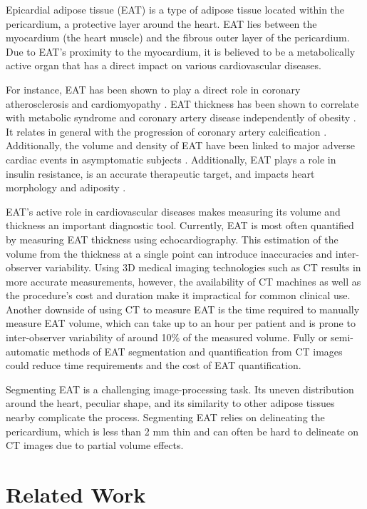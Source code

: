 Epicardial adipose tissue (EAT) is a type of adipose tissue located within the pericardium, a protective layer around the heart. EAT lies between the myocardium (the heart muscle) and the fibrous outer layer of the pericardium. Due to EAT's proximity to the myocardium, it is believed to be a metabolically active organ that has a direct impact on various cardiovascular diseases.

For instance, EAT has been shown to play a direct role in coronary atherosclerosis and cardiomyopathy \cite{Sacks2007, Marwan2013}. EAT thickness has been shown to correlate with metabolic syndrome \cite{Chenn2009} and coronary artery disease independently of obesity \cite{Iacobellis2011}. It relates in general with the progression of coronary artery calcification \cite{Gorter2008}. Additionally, the volume and density of EAT have been linked to major adverse cardiac events in asymptomatic subjects \cite{Goeller2018}. Additionally, EAT plays a role in insulin resistance, is an accurate therapeutic target, and impacts heart morphology and adiposity \cite{Iacobellis2009-2}.

EAT's active role in cardiovascular diseases makes measuring its volume and thickness an important diagnostic tool. Currently, EAT is most often quantified by measuring EAT thickness using echocardiography. This estimation of the volume from the thickness at a single point can introduce inaccuracies and inter-observer variability. Using 3D medical imaging technologies such as CT results in more accurate measurements, however, the availability of CT machines as well as the procedure's cost and duration make it impractical for common clinical use. Another downside of using CT to measure EAT is the time required to manually measure EAT volume, which can take up to an hour per patient \cite{Militello2019} and is prone to inter-observer variability of around 10\% \cite{Marwan2013} of the measured volume. Fully or semi-automatic methods of EAT segmentation and quantification from CT images could reduce time requirements and the cost of EAT quantification.

Segmenting EAT is a challenging image-processing task. Its uneven distribution around the heart, peculiar shape, and its similarity to other adipose tissues nearby complicate the process. Segmenting EAT relies on delineating the pericardium, which is less than 2 mm thin and can often be hard to delineate on CT images due to partial volume effects.

\section{Related Work}

